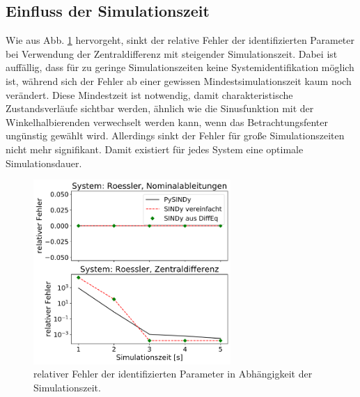 \subsection{Einfluss der Simulationszeit}
Wie aus Abb. \ref{fig:errors_tspan} hervorgeht, sinkt der relative Fehler der identifizierten Parameter bei Verwendung der Zentraldifferenz mit steigender Simulationszeit. Dabei ist auffällig, dass für zu geringe Simulationszeiten keine Systemidentifikation möglich ist, während sich der Fehler ab einer gewissen Mindestsimulationszeit kaum noch verändert. Diese Mindestzeit ist notwendig, damit charakteristische Zustandsverläufe sichtbar werden, ähnlich wie die Sinusfunktion mit der Winkelhalbierenden verwechselt werden kann, wenn das Betrachtungsfenter ungünstig gewählt wird. Allerdings sinkt der Fehler für große Simulationszeiten nicht mehr signifikant. Damit existiert für jedes System eine optimale Simulationsdauer.
\begin{figure} %
	\centering
	  \includegraphics[width=75mm]{images/errors_roessler_tspan_variation.png}
	\caption{relativer Fehler der identifizierten Parameter in Abhängigkeit der Simulationszeit.}
	\label{fig:errors_tspan}
\end{figure}


